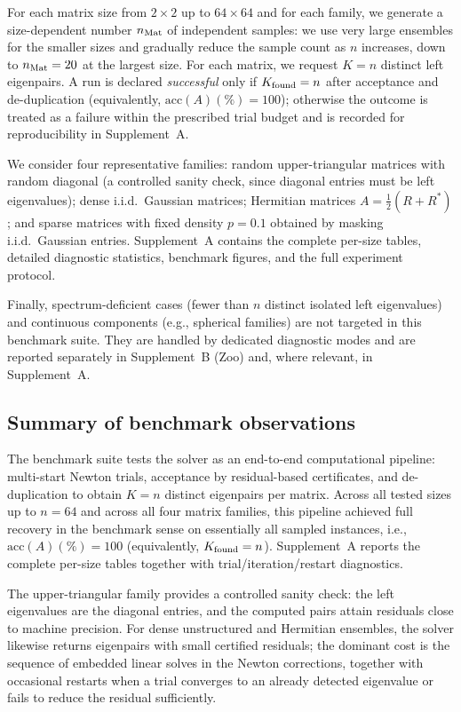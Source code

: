 \documentclass[preprint,12pt]{elsarticle}  %
\theoremstyle{definition}
\theoremstyle{definition}
\theoremstyle{definition}
\theoremstyle{definition}
\theoremstyle{definition}
\theoremstyle{remark}
\theoremstyle{remark}
\theoremstyle{remark}
\begin{document}
For each matrix size from $2\times2$ up to $64\times64$ and for each family, we generate a size-dependent number $n_{\rm Mat}$ of independent samples: we use very large ensembles for the smaller sizes and gradually reduce the sample count as $n$ increases, down to $n_{\rm Mat}=20$ at the largest size. For each matrix, we request $K=n$ distinct left eigenpairs. A run is declared \emph{successful} only if $K_{\rm found}=n$ after acceptance and de-duplication (equivalently, $\mathrm{acc}(A)(\%)=100$); otherwise the outcome is treated as a failure within the prescribed trial budget and is recorded for reproducibility in Supplement~A.

We consider four representative families: random upper-triangular matrices with random diagonal (a controlled sanity check, since diagonal entries must be left eigenvalues); dense i.i.d.\ Gaussian matrices; Hermitian matrices
$A=\tfrac12(R+R^\ast)$; and sparse matrices with fixed density $p=0.1$ obtained by masking i.i.d.\ Gaussian entries.
Supplement~A contains the complete per-size tables, detailed diagnostic statistics, benchmark figures, and the full experiment protocol.

Finally, spectrum-deficient cases (fewer than $n$ distinct isolated left eigenvalues) and continuous components (e.g., spherical families) are not targeted in this benchmark suite. They are handled by dedicated diagnostic modes and are reported separately in Supplement~B (Zoo) and, where relevant, in Supplement~A.

\subsection{Summary of benchmark observations}
\label{app:bench_takeaways}
The benchmark suite tests the solver as an end-to-end computational pipeline: multi-start Newton trials, acceptance by residual-based certificates, and de-duplication to obtain $K=n$ distinct eigenpairs per matrix. Across all tested sizes up to $n=64$ and across all four matrix families, this pipeline achieved full recovery in the benchmark sense on essentially all sampled instances, i.e., $\mathrm{acc}(A)(\%)=100$ (equivalently, $K_{\rm found}=n$). Supplement~A reports the complete per-size tables together with trial/iteration/restart diagnostics.

The upper-triangular family provides a controlled sanity check: the left eigenvalues are the diagonal entries, and the computed pairs attain residuals close to machine precision. For dense unstructured and Hermitian ensembles, the solver likewise returns eigenpairs with small certified residuals; the dominant cost is the sequence of embedded linear solves in the Newton corrections, together with occasional restarts when a trial converges to an already detected eigenvalue or fails to reduce the residual sufficiently.
\end{document}
